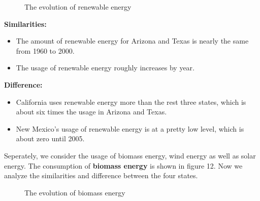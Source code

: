\documentclass{mcmthesis}
\begin{document}
\begin{figure}[H]
  \caption{The evolution of renewable energy}\label{figure11}
\end{figure}

{\bf{Similarities:}}

\begin{itemize}
\item The amount of renewable energy for Arizona and Texas is nearly the same from 1960 to 2000.
\item The usage of renewable energy roughly increases by year.
\end{itemize}

\newpage

{\bf{Difference:}}

\begin{itemize}
\item California uses renewable energy more than the rest three states, which is about six times the usage in Arizona and Texas.
\item New Mexico's usage of renewable energy is at a pretty low level, which is about zero until 2005.
\end{itemize}

Seperately, we consider the usage of biomass energy, wind energy as well as solar energy. The consumption of {\bf{biomass energy}} is shown in figure 12. Now we analyze the similarities and difference between the four states.

\begin{figure}[H]
  \caption{The evolution of biomass energy}\label{figure12}
\end{figure}
\end{document}
